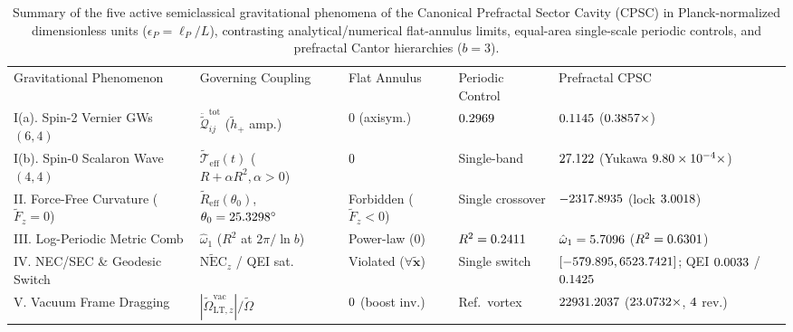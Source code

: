 \documentclass[aps,prd,twocolumn,10pt,showkeys,nofootinbib,floatfix,longbibliography]{revtex4-2}
\begin{document}
\begin{table}[t]
\caption{Summary of the five active semiclassical gravitational phenomena of the Canonical Prefractal Sector Cavity (CPSC) in Planck-normalized dimensionless units ($\epsilon_P = \ell_P/L$), contrasting analytical/numerical flat-annulus limits, equal-area single-scale periodic controls, and prefractal Cantor hierarchies ($b=3$).}
\label{tab:summary_five_effects}
\footnotesize
\begin{ruledtabular}
\begin{tabular}{lllll}
Gravitational Phenomenon & Governing Coupling & Flat Annulus & Periodic Control & Prefractal CPSC \\
\colrule
I(a). Spin-2 Vernier GWs $(6,4)$ & $\ddot{\tilde{\mathcal{Q}}}_{ij}^{\mathrm{tot}}$ ($\tilde{h}_+$ amp.) & $0$ (axisym.) & $0.2969$ & $0.1145$ ($0.3857\times$) \\
I(b). Spin-0 Scalaron Wave $(4,4)$ & $\tilde{\mathcal{T}}_{\mathrm{eff}}(t)$ ($R+\alpha R^2, \alpha>0$) & $0$ & Single-band & $27.122$ (Yukawa $9.80\times 10^{-4}\times$) \\
II. Force-Free Curvature ($\tilde{F}_z=0$) & $\tilde{R}_{\mathrm{eff}}(\theta_0)$, $\theta_0=25.3298^\circ$ & Forbidden ($\tilde{F}_z < 0$) & Single crossover & $-2317.8935$ (lock $3.0018$) \\
III. Log-Periodic Metric Comb & $\hat{\omega}_1$ ($R^2$ at $2\pi/\ln b$) & Power-law ($0$) & $R^2=0.2411$ & $\hat{\omega}_1=5.7096$ ($R^2=0.6301$) \\
IV. NEC/SEC \& Geodesic Switch & $\widetilde{\mathrm{NEC}}_z$ / QEI sat. & Violated ($\forall \tilde{\mathbf{x}}$) & Single switch & $[-579.895, 6523.7421]$; QEI $0.0033$ / $0.1425$ \\
V. Vacuum Frame Dragging & $|\tilde{\Omega}_{\mathrm{LT},z}^{\mathrm{vac}}|/\tilde{\Omega}$ & $0$ (boost inv.) & Ref.\ vortex & $22931.2037$ ($23.0732\times$, $4$ rev.) \\
\end{tabular}
\end{ruledtabular}
\end{table}
\end{document}
